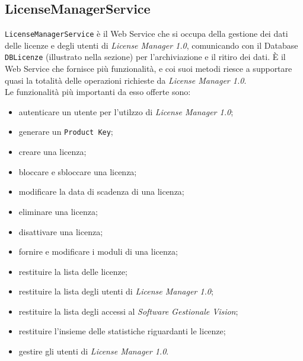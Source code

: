 \subsection{LicenseManagerService}
\texttt{LicenseManagerService} è il Web Service che si occupa della gestione dei dati delle licenze e degli utenti di \textit{License Manager 1.0}, comunicando con il Database \texttt{DBLicenze} (illustrato nella sezione) per l'archiviazione e il ritiro dei dati. È il Web Service che fornisce più funzionalità, e coi suoi metodi riesce a supportare quasi la totalità delle operazioni richieste da \textit{License Manager 1.0}.\\
Le funzionalità più importanti da esso offerte sono:

\begin{itemize}
\item autenticare un utente per l'utilzzo di \textit{License Manager 1.0};
\item generare un \texttt{Product Key};
\item creare una licenza;
\item bloccare e sbloccare una licenza;
\item modificare la data di scadenza di una licenza;
\item eliminare una licenza;
\item disattivare una licenza;
\item fornire e modificare i moduli di una licenza;
\item restituire la lista delle licenze;
\item restituire la lista degli utenti di \textit{License Manager 1.0};
\item restituire la lista degli accessi al \textit{Software Gestionale Vision};
\item restituire l'insieme delle statistiche riguardanti le licenze;
\item gestire gli utenti di \textit{License Manager 1.0}.

\end{itemize}
 


